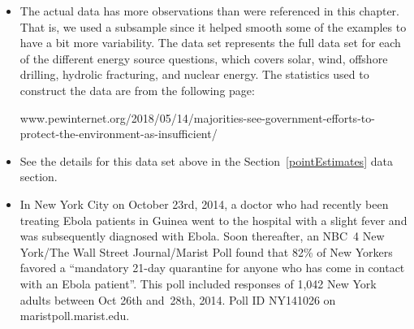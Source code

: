 \begin{itemize}
\item[\ref{pointEstimates}]
    The actual data has more observations than were referenced
    in this chapter.
    That is, we used a subsample since it helped smooth some
    of the examples to have a bit more variability.
    The  data set represents
    the full data set for each of the different energy source
    questions, which covers solar, wind, offshore drilling,
    hydrolic fracturing, and nuclear energy.
    The statistics used to construct the data are from
    the following page:
    \begin{center}
        {{\small{www.pewinternet.org/2018/05/14/majorities-see-government-efforts-to-protect-the-environment-as-insufficient/}}}
    \end{center}
    
\item[\ref{confidenceIntervals}]
    See the details for this data set above
    in the Section~\ref{pointEstimates} data section.
\item[\ref{confidenceIntervals}]
    In New York City on October 23rd, 2014, a doctor who had
    recently been treating Ebola patients in Guinea went to
    the hospital with a slight fever and was subsequently
    diagnosed with Ebola.
    Soon thereafter, an NBC~4 New York/The Wall Street
    Journal/Marist Poll found that
    82\% of New Yorkers favored a
    ``mandatory 21-day quarantine for anyone who has come
    in contact with an Ebola patient''.
    This poll included responses of 1,042
    New York adults between Oct 26th and~28th, 2014.
        {Poll ID NY141026 on maristpoll.marist.edu}.


\end{itemize}
